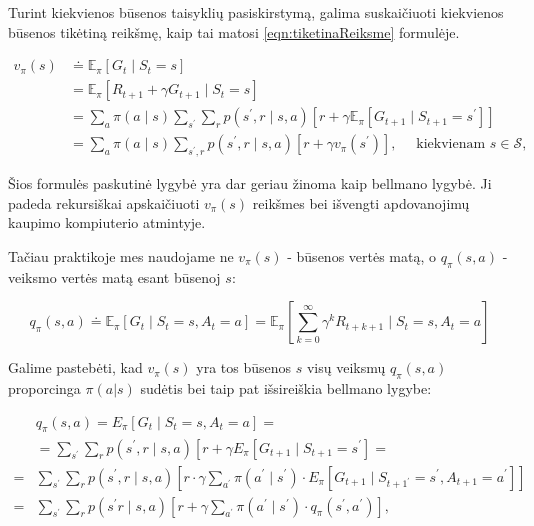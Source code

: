 \documentclass[a4paper, 12pt]{article}
\begin{document}
Turint kiekvienos būsenos taisyklių pasiskirstymą, galima suskaičiuoti kiekvienos būsenos tikėtiną reikšmę, kaip tai matosi \ref {eqn:tiketinaReiksme} formulėje.

\begin{equation}
\label{eqn:tiketinaReiksme}
\begin{aligned}
v_{\pi}(s) & \doteq \mathbb{E}_{\pi}\left[G_{t} \mid S_{t}=s\right] \\
&=\mathbb{E}_{\pi}\left[R_{t+1}+\gamma G_{t+1} \mid S_{t}=s\right] \\
&=\sum_{a} \pi(a \mid s) \sum_{s^{\prime}} \sum_{r} p\left(s^{\prime}, r \mid s, a\right)\left[r+\gamma \mathbb{E}_{\pi}\left[G_{t+1} \mid S_{t+1}=s^{\prime}\right]\right] \\
&=\sum_{a} \pi(a \mid s) \sum_{s^{\prime}, r} p\left(s^{\prime}, r \mid s, a\right)\left[r+\gamma v_{\pi}\left(s^{\prime}\right)\right], \quad \text { kiekvienam } s \in \mathcal{S},
\end{aligned}
\end{equation}

Šios formulės paskutinė lygybė yra dar geriau žinoma kaip bellmano lygybė. Ji padeda rekursiškai apskaičiuoti $v_{\pi}(s)$ reikšmes bei išvengti apdovanojimų kaupimo kompiuterio atmintyje.

Tačiau praktikoje mes naudojame ne $v_{\pi}(s)$ - būsenos vertės matą, o $q_{\pi}(s, a)$ - veiksmo vertės matą esant būsenoj $s$:

\begin{equation}
q_{\pi}(s, a) \doteq \mathbb{E}_{\pi}\left[G_{t} \mid S_{t}=s, A_{t}=a\right]=\mathbb{E}_{\pi}\left[\sum_{k=0}^{\infty} \gamma^{k} R_{t+k+1} \mid S_{t}=s, A_{t}=a\right]
\end{equation}

Galime pastebėti, kad $v_{\pi}(s)$ yra tos būsenos $s$ visų veiksmų $q_{\pi}(s, a)$ proporcinga $\pi(a|s)$ sudėtis bei taip pat išsireiškia bellmano lygybe:

\begin{equation}
\begin{aligned}
& q_{\pi}(s, a)=E_{\pi}\left[G_{t} \mid S_{t}=s, A_{t}=a\right]=\\
&=\sum_{s^{\prime}} \sum_{r} p\left(s^{\prime}, r \mid s, a\right)\left[r+\gamma E_{\pi}\left[G_{t+1} \mid S_{t+1}=s^{\prime}\right]=\right.\\
=& \sum_{s^{\prime}} \sum_{r} p\left(s^{\prime}, r\mid s, a\right)\left[r \cdot \gamma \sum_{a^{\prime}} \pi\left(a^{\prime} \mid s^{\prime}\right) \cdot E_{\pi}\left[G_{t+1} \mid S_{t+1^{\prime}}=s^{\prime}, A_{t+1}=a^{\prime}\right]\right] \\
=& \sum_{s^{\prime}} \sum_{r} p\left(s^{\prime} r \mid s, a\right)\left[r+\gamma \sum_{a^{\prime}} \pi\left(a^{\prime} \mid s^{\prime}\right) \cdot q_{\pi}\left(s^{\prime}, a^{\prime}\right)\right],
\end{aligned}
\end{equation}
\end{document}
